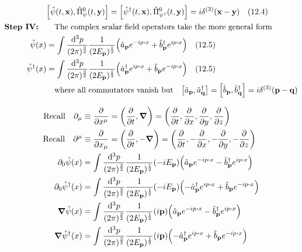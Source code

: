 \documentclass{article}
\begin{document}
\begin{align*}
                           & \bqty{\hat{\psi}(t,\vb{x}),\hat{\Pi}^0_\psi(t,\vb{y})}  = \bqty{\hat{\psi}^\dagger(t,\vb{x}),\hat{\Pi}^0_{\psi^\dagger}(t,\vb{y})}=i\delta^{(3)}(\vb{x}-\vb{y})\qq{(12.4)}                     \\
  \qq*{\textbf{Step IV:}}  & \qq{The complex scalar field operators take the more general form}                                                                                                                             \\
  \hat{\psi}(x)            & =\int \frac{\dd[3]{p}}{(2\pi)^\frac{3}{2}}  \frac{1}{(2E_{\vb{p}})^{\frac{1}{2}}}  \pqty{\hat{a}_{\vb{p}}e^{-ip\vdot x}+\hat{b}^\dagger_{\vb{p}}e^{ip\vdot x}} \qq{(12.5)}                     \\
  \hat{\psi}^\dagger (x)   & =\int \frac{\dd[3]{p}}{(2\pi)^\frac{3}{2}}  \frac{1}{(2E_{\vb{p}})^{\frac{1}{2}}}  \pqty{\hat{a}^\dagger_{\vb{p}}e^{ip\vdot x}+\hat{b}_{\vb{p}}e^{-ip\vdot x}} \qq{(12.5)}                     \\
                           & \qq{where all commutators vanish but}\bqty{\hat{a}_{\vb{p}},\hat{a}_{\vb{q}}^\dagger}=\bqty{\hat{b}_{\vb{p}},\hat{b}_{\vb{q}}^\dagger}=i\delta^{(3)}(\vb{p}-\vb{q})                            \\
\end{align*}


\begin{align*}
  \qq*{Recall}\partial_\mu          & \equiv\pdv{x^\mu}=\pqty{\pdv{t},\grad}=\pqty{\pdv{t},\pdv{x},\pdv{y},\pdv{z}}                                                                                                 \\
  \qq*{Recall}\partial^\mu          & \equiv\pdv{x_\mu}=\pqty{\pdv{t},-\grad}=\pqty{\pdv{t},-\pdv{x},-\pdv{y},-\pdv{z}}                                                                                             \\
  \partial_0 \hat{\psi}(x)          & =\int \frac{\dd[3]{p}}{(2\pi)^\frac{3}{2}}  \frac{1}{(2E_{\vb{p}})^{\frac{1}{2}}} (-iE_{\vb{p}}) \pqty{\hat{a}_{\vb{p}}e^{-ip\vdot x}-\hat{b}^\dagger_{\vb{p}}e^{ip\vdot x}}  \\
  \partial_0 \hat{\psi}^\dagger (x) & =\int \frac{\dd[3]{p}}{(2\pi)^\frac{3}{2}}  \frac{1}{(2E_{\vb{p}})^{\frac{1}{2}}} (-iE_{\vb{p}}) \pqty{-\hat{a}^\dagger_{\vb{p}}e^{ip\vdot x}+\hat{b}_{\vb{p}}e^{-ip\vdot x}} \\
  \grad{\hat{\psi}(x)}              & =\int \frac{\dd[3]{p}}{(2\pi)^\frac{3}{2}}  \frac{1}{(2E_{\vb{p}})^{\frac{1}{2}}} (i\vb{p}) \pqty{\hat{a}_{\vb{p}}e^{-ip\vdot x}-\hat{b}^\dagger_{\vb{p}}e^{ip\vdot x}}       \\
  \grad{\hat{\psi}^\dagger (x)}     & =\int \frac{\dd[3]{p}}{(2\pi)^\frac{3}{2}}  \frac{1}{(2E_{\vb{p}})^{\frac{1}{2}}} (i\vb{p}) \pqty{-\hat{a}^\dagger_{\vb{p}}e^{ip\vdot x}+\hat{b}_{\vb{p}}e^{-ip\vdot x}}      \\
\end{align*}
\end{document}
